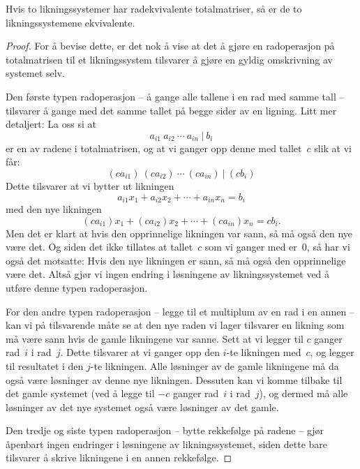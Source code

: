 \begin{thm}
\label{thm:radekvivalens}
Hvis to likningssystemer har radekvivalente totalmatriser, så er de to
likningssystemene ekvivalente.
\end{thm}
\begin{proof}
For å bevise dette, er det nok å vise at det å gjøre en radoperasjon
på totalmatrisen til et likningssystem tilsvarer å gjøre en gyldig
omskrivning av systemet selv.

Den første typen radoperasjon -- å gange alle tallene i en rad med
samme tall -- tilsvarer å gange med det samme tallet på begge sider av
en ligning.  Litt mer detaljert: La oss si at
\[
a_{i1}\ a_{i2}\ \cdots\ a_{in}\ |\ b_i
\]
er en av radene i totalmatrisen, og at vi ganger opp denne med
tallet~$c$ slik at vi får:
\[
(c a_{i1})\ (c a_{i2})\ \cdots\ (c a_{in})\ |\ (c b_i)
\]
Dette tilsvarer at vi bytter ut likningen
\[
a_{i1} x_1 + a_{i2} x_2 + \cdots + a_{in} x_n = b_i
\]
med den nye likningen
\[
(c a_{i1}) x_1 + (c a_{i2}) x_2 + \cdots + (c a_{in}) x_n = c b_i.
\]
Men det er klart at hvis den opprinnelige likningen var sann, så må
også den nye være det.  Og siden det ikke tillates at tallet~$c$ som
vi ganger med er~$0$, så har vi også det motsatte: Hvis den nye
likningen er sann, så må også den opprinnelige være det.  Altså gjør
vi ingen endring i løsningene av likningssystemet ved å utføre denne
typen radoperasjon.

For den andre typen radoperasjon -- legge til et multiplum av en rad i
en annen -- kan vi på tilsvarende måte se at den nye raden vi lager
tilsvarer en likning som må være sann hvis de gamle likningene var
sanne.  Sett at vi legger til $c$ ganger rad~$i$ i rad~$j$.  Dette
tilsvarer at vi ganger opp den $i$-te likningen med~$c$, og legger til
resultatet i den $j$-te likningen.  Alle løsninger av de gamle
likningene må da også være løsninger av denne nye likningen.  Dessuten
kan vi komme tilbake til det gamle systemet (ved å legge til $-c$
ganger rad~$i$ i rad~$j$), og dermed må alle løsninger av det nye
systemet også være løsninger av det gamle.

Den tredje og siste typen radoperasjon -- bytte rekkefølge på radene
-- gjør åpenbart ingen endringer i løsningene av likningssystemet,
siden dette bare tilsvarer å skrive likningene i en annen rekkefølge.
\end{proof}

